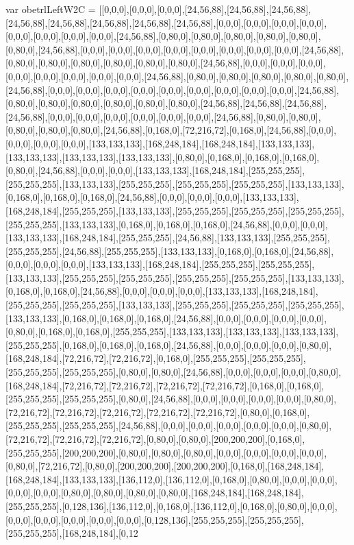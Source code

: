 var obetrlLeftW2C = [[0,0,0],[0,0,0],[0,0,0],[24,56,88],[24,56,88],[24,56,88],[24,56,88],[24,56,88],[24,56,88],[24,56,88],[24,56,88],[0,0,0],[0,0,0],[0,0,0],[0,0,0],[0,0,0],[0,0,0],[0,0,0],[0,0,0],[24,56,88],[0,80,0],[0,80,0],[0,80,0],[0,80,0],[0,80,0],[0,80,0],[24,56,88],[0,0,0],[0,0,0],[0,0,0],[0,0,0],[0,0,0],[0,0,0],[0,0,0],[0,0,0],[24,56,88],[0,80,0],[0,80,0],[0,80,0],[0,80,0],[0,80,0],[0,80,0],[24,56,88],[0,0,0],[0,0,0],[0,0,0],[0,0,0],[0,0,0],[0,0,0],[0,0,0],[0,0,0],[24,56,88],[0,80,0],[0,80,0],[0,80,0],[0,80,0],[0,80,0],[24,56,88],[0,0,0],[0,0,0],[0,0,0],[0,0,0],[0,0,0],[0,0,0],[0,0,0],[0,0,0],[0,0,0],[24,56,88],[0,80,0],[0,80,0],[0,80,0],[0,80,0],[0,80,0],[0,80,0],[24,56,88],[24,56,88],[24,56,88],[24,56,88],[0,0,0],[0,0,0],[0,0,0],[0,0,0],[0,0,0],[0,0,0],[24,56,88],[0,80,0],[0,80,0],[0,80,0],[0,80,0],[0,80,0],[24,56,88],[0,168,0],[72,216,72],[0,168,0],[24,56,88],[0,0,0],[0,0,0],[0,0,0],[0,0,0],[133,133,133],[168,248,184],[168,248,184],[133,133,133],[133,133,133],[133,133,133],[133,133,133],[0,80,0],[0,168,0],[0,168,0],[0,168,0],[0,80,0],[24,56,88],[0,0,0],[0,0,0],[133,133,133],[168,248,184],[255,255,255],[255,255,255],[133,133,133],[255,255,255],[255,255,255],[255,255,255],[133,133,133],[0,168,0],[0,168,0],[0,168,0],[24,56,88],[0,0,0],[0,0,0],[0,0,0],[133,133,133],[168,248,184],[255,255,255],[133,133,133],[255,255,255],[255,255,255],[255,255,255],[255,255,255],[133,133,133],[0,168,0],[0,168,0],[0,168,0],[24,56,88],[0,0,0],[0,0,0],[133,133,133],[168,248,184],[255,255,255],[24,56,88],[133,133,133],[255,255,255],[255,255,255],[24,56,88],[255,255,255],[133,133,133],[0,168,0],[0,168,0],[24,56,88],[0,0,0],[0,0,0],[0,0,0],[133,133,133],[168,248,184],[255,255,255],[255,255,255],[133,133,133],[255,255,255],[255,255,255],[255,255,255],[255,255,255],[133,133,133],[0,168,0],[0,168,0],[24,56,88],[0,0,0],[0,0,0],[0,0,0],[133,133,133],[168,248,184],[255,255,255],[255,255,255],[133,133,133],[255,255,255],[255,255,255],[255,255,255],[133,133,133],[0,168,0],[0,168,0],[0,168,0],[24,56,88],[0,0,0],[0,0,0],[0,0,0],[0,0,0],[0,80,0],[0,168,0],[0,168,0],[255,255,255],[133,133,133],[133,133,133],[133,133,133],[255,255,255],[0,168,0],[0,168,0],[0,168,0],[24,56,88],[0,0,0],[0,0,0],[0,0,0],[0,80,0],[168,248,184],[72,216,72],[72,216,72],[0,168,0],[255,255,255],[255,255,255],[255,255,255],[255,255,255],[0,80,0],[0,80,0],[24,56,88],[0,0,0],[0,0,0],[0,0,0],[0,80,0],[168,248,184],[72,216,72],[72,216,72],[72,216,72],[72,216,72],[0,168,0],[0,168,0],[255,255,255],[255,255,255],[0,80,0],[24,56,88],[0,0,0],[0,0,0],[0,0,0],[0,0,0],[0,80,0],[72,216,72],[72,216,72],[72,216,72],[72,216,72],[72,216,72],[0,80,0],[0,168,0],[255,255,255],[255,255,255],[24,56,88],[0,0,0],[0,0,0],[0,0,0],[0,0,0],[0,0,0],[0,80,0],[72,216,72],[72,216,72],[72,216,72],[0,80,0],[0,80,0],[200,200,200],[0,168,0],[255,255,255],[200,200,200],[0,80,0],[0,80,0],[0,80,0],[0,0,0],[0,0,0],[0,0,0],[0,0,0],[0,80,0],[72,216,72],[0,80,0],[200,200,200],[200,200,200],[0,168,0],[168,248,184],[168,248,184],[133,133,133],[136,112,0],[136,112,0],[0,168,0],[0,80,0],[0,0,0],[0,0,0],[0,0,0],[0,0,0],[0,80,0],[0,80,0],[0,80,0],[0,80,0],[168,248,184],[168,248,184],[255,255,255],[0,128,136],[136,112,0],[0,168,0],[136,112,0],[0,168,0],[0,80,0],[0,0,0],[0,0,0],[0,0,0],[0,0,0],[0,0,0],[0,0,0],[0,128,136],[255,255,255],[255,255,255],[255,255,255],[168,248,184],[0,12